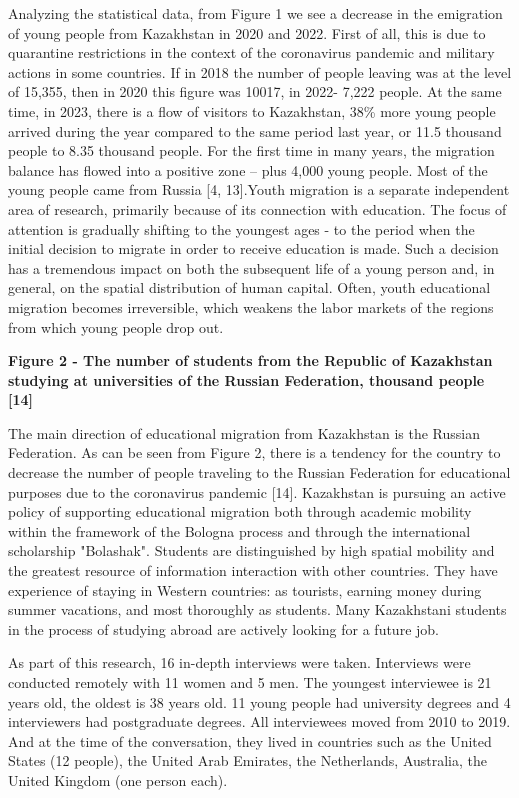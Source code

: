 {Analyzing the statistical data, from Figure 1 we see a decrease in the
emigration of young people from Kazakhstan in 2020 and 2022. First of
all, this is due to quarantine restrictions in the context of the
coronavirus pandemic and military actions in some countries. If in 2018
the number of people leaving was at the level of 15,355, then in 2020
this figure was 10017, in 2022- 7,222 people. At the same time, in 2023,
there is a flow of visitors to Kazakhstan, 38\% more young people
arrived during the year compared to the same period last year, or 11.5
thousand people to 8.35 thousand people. For the first time in many
years, the migration balance has flowed into a positive zone -- plus
4,000 young people. Most of the young people came from Russia {[}4,
13{]}.Youth migration is a separate independent area of research,
primarily because of its connection with education. The focus of
attention is gradually shifting to the youngest ages - to the period
when the initial decision to migrate in order to receive education is
made. Such a decision has a tremendous impact on both the subsequent
life of a young person and, in general, on the spatial distribution of
human capital. Often, youth educational migration becomes irreversible,
which weakens the labor markets of the regions from which young people
drop out.

{\bfseries Figure 2 - The number of students from the Republic of
Kazakhstan studying at universities of the Russian Federation, thousand
people {[}14{]}}

The main direction of educational migration from Kazakhstan is the
Russian Federation. As can be seen from Figure 2, there is a tendency
for the country to decrease the number of people traveling to the
Russian Federation for educational purposes due to the coronavirus
pandemic {[}14{]}. Kazakhstan is pursuing an active policy of supporting
educational migration both through academic mobility within the
framework of the Bologna process and through the international
scholarship "Bolashak". Students are distinguished by high spatial
mobility and the greatest resource of information interaction with other
countries. They have experience of staying in Western countries: as
tourists, earning money during summer vacations, and most thoroughly as
students. Many Kazakhstani students in the process of studying abroad
are actively looking for a future job.

As part of this research, 16 in-depth interviews were taken. Interviews
were conducted remotely with 11 women and 5 men. The youngest
interviewee is 21 years old, the oldest is 38 years old. 11 young people
had university degrees and 4 interviewers had postgraduate degrees. All
interviewees moved from 2010 to 2019. And at the time of the
conversation, they lived in countries such as the United States (12
people), the United Arab Emirates, the Netherlands, Australia, the
United Kingdom (one person each).

}
